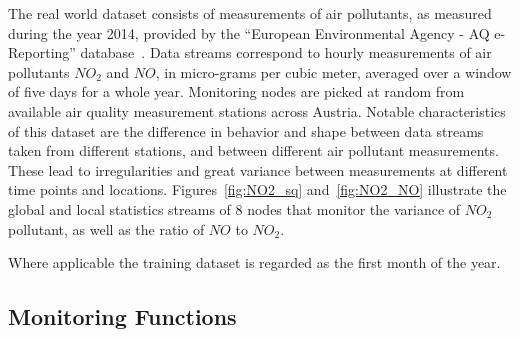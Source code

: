 The real world dataset consists of measurements of air pollutants, as measured during the year 2014, provided by the ``European Environmental Agency - AQ e-Reporting'' database~\cite{AirBase}. Data streams correspond to hourly measurements of air pollutants $NO_2$ and $NO$, in micro-grams per cubic meter, averaged over a window of five days for a whole year. Monitoring nodes are picked at random from available air quality measurement stations across Austria. Notable characteristics of this dataset are the difference in behavior and shape between data streams taken from different stations, and between different air pollutant measurements. These lead to irregularities and great variance between measurements at different time points and locations. Figures~\ref{fig:NO2_sq} and~\ref{fig:NO2_NO} illustrate the global and local statistics streams of 8 nodes that monitor the variance of $NO_2$ pollutant, as well as the ratio of $NO$ to $NO_2$.

Where applicable the training dataset is regarded as the first month of the year.

\subsection{Monitoring Functions}

